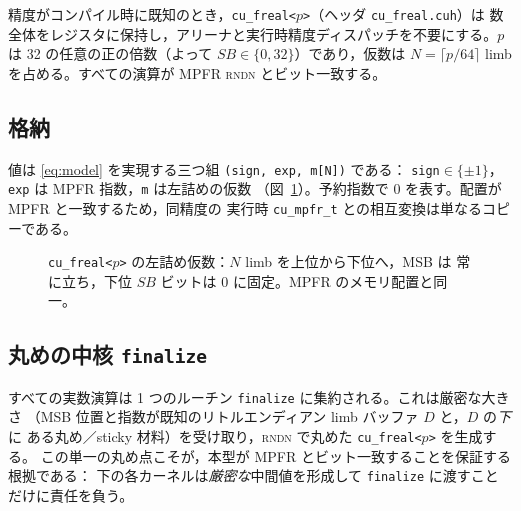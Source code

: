 \documentclass[uplatex,dvipdfmx,a4paper,11pt]{jsarticle}
\newcommand{\code}[1]{\texttt{#1}}
\newcommand{\PB}{\ensuremath{p}}
\newcommand{\Nlimb}{\ensuremath{N}}
\newcommand{\rndn}{\textsc{rndn}}
\begin{document}
精度がコンパイル時に既知のとき，\code{cu\_freal<\PB>}（ヘッダ \code{cu\_freal.cuh}）は
数全体をレジスタに保持し，アリーナと実行時精度ディスパッチを不要にする。\PB{} は
32 の任意の正の倍数（よって $\mathit{SB}\in\{0,32\}$）であり，仮数は
$\Nlimb=\lceil\PB/64\rceil$ limb を占める。すべての演算が MPFR \rndn{} とビット一致する。

\subsection{格納}
\label{sec:freal-storage}

値は \eqref{eq:model} を実現する三つ組 \code{(sign, exp, m[N])} である：
\code{sign}$\in\{\pm1\}$，\code{exp} は MPFR 指数，\code{m} は左詰めの仮数
（図~\ref{fig:layout}）。予約指数で 0 を表す。配置が MPFR と一致するため，同精度の
実行時 \code{cu\_mpfr\_t} との相互変換は単なるコピーである。

\begin{figure}[h]
\centering
{}
\caption{\code{cu\_freal<\PB>} の左詰め仮数：$\Nlimb$ limb を上位から下位へ，MSB は
常に立ち，下位 $\mathit{SB}$ ビットは 0 に固定。MPFR のメモリ配置と同一。}
\label{fig:layout}
\end{figure}

\subsection{丸めの中核 \texttt{finalize}}
\label{sec:finalize}

すべての実数演算は 1 つのルーチン \code{finalize} に集約される。これは厳密な大きさ
（MSB 位置と指数が既知のリトルエンディアン limb バッファ $D$ と，$D$ の\emph{下}に
ある丸め／sticky 材料）を受け取り，\rndn{} で丸めた \code{cu\_freal<\PB>} を生成する。
この単一の丸め点こそが，本型が MPFR とビット一致することを保証する根拠である：
下の各カーネルは\emph{厳密な}中間値を形成して \code{finalize} に渡すことだけに責任を負う。
\end{document}
